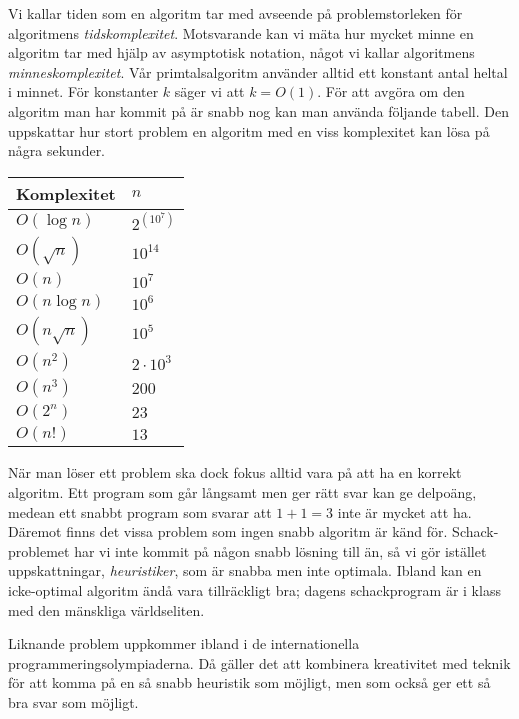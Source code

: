 \documentclass[10pt,a4paper]{article}
\theoremstyle{problem}
\begin{document}
Vi kallar tiden som en algoritm tar med avseende på problemstorleken för algoritmens \emph{tidskomplexitet}.
Motsvarande kan vi mäta hur mycket minne en algoritm tar med hjälp av asymptotisk notation, något vi kallar algoritmens \emph{minneskomplexitet}.
Vår primtalsalgoritm använder alltid ett konstant antal heltal i minnet. För konstanter $k$ säger vi att $k = O(1)$.
För att avgöra om den algoritm man har kommit på är snabb nog kan man använda följande tabell. Den uppskattar hur stort problem
en algoritm med en viss komplexitet kan lösa på några sekunder.

\begin{center}
\begin{tabular}{ | l | l | }
\hline
Komplexitet & $n$ \\ \hline
$O(\log n)$ & $2^{(10^7)}$ \\ \hline
$O(\sqrt{n})$ & $10^{14}$ \\ \hline
$O(n)$ & $10^7$ \\ \hline
$O(n \log n)$ & $10^6$ \\ \hline
$O(n \sqrt n)$ & $10^5$ \\ \hline
$O(n^2)$ & $2 \cdot 10^3$ \\ \hline
$O(n^3)$ & $200$ \\ \hline
$O(2^n)$ & $23$ \\ \hline
$O(n!)$ & $13$ \\ \hline
\end{tabular}
\end{center}

När man löser ett problem ska dock fokus alltid vara på att ha en korrekt algoritm. Ett program som går långsamt men ger rätt svar kan ge
delpoäng, medean ett snabbt program som svarar att $1 + 1 = 3$ inte är mycket att ha. Däremot finns det vissa problem som ingen snabb
algoritm är känd för. Schack-problemet har vi inte kommit på någon snabb lösning till än, så vi gör istället uppskattningar, \emph{heuristiker},
som är snabba men inte optimala. Ibland kan en icke-optimal algoritm ändå vara tillräckligt bra; dagens schackprogram är i klass med den
mänskliga världseliten.

Liknande problem uppkommer ibland i de internationella programmeringsolympiaderna. Då gäller det att kombinera kreativitet med teknik
för att komma på en så snabb heuristik som möjligt, men som också ger ett så bra svar som möjligt.
\end{document}
